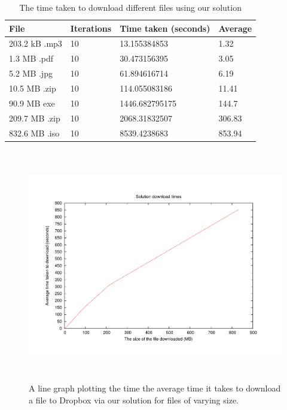 \documentclass[12pt, titlepage]{article}
\begin{document}
\bigskip
\begin{table}[H]
\begin{center}
    \begin{tabular}{ | l | l | l | l |}
    \hline
    \textbf{File} & \textbf{Iterations} & \textbf{Time taken (seconds)} & \textbf{Average} \\ \hline
    203.2 kB .mp3 & 10 & 13.155384853 & 1.32 \\ \hline
    1.3 MB .pdf  & 10 & 30.473156395 & 3.05 \\ \hline
    5.2 MB .jpg & 10 & 61.894616714 & 6.19 \\ \hline
    10.5 MB .zip & 10 & 114.055083186 & 11.41 \\ \hline
    90.9 MB exe & 10 & 1446.682795175  & 144.7 \\ \hline
    209.7 MB .zip & 10 & 2068.31832507 & 306.83 \\ \hline
    832.6 MB .iso & 10 & 8539.4238683 & 853.94 \\ \hline
    \end{tabular}
    \caption{The time taken to download different files using our solution} \label{tab:downloadBenchmark}
    \end{center}
    \end{table}
\bigskip

\begin{figure}[H]
\centerline{\includegraphics[height=4.0in,width=7in,angle=0]{plots/solutionDownload/solutionDownloadTimes.pdf}}
\caption{A line graph plotting the time the average time it takes to download a file to Dropbox via our solution for files of varying size.}
\label{fig:dropboxDownloadLineGraph}
\end{figure}
\end{document}
